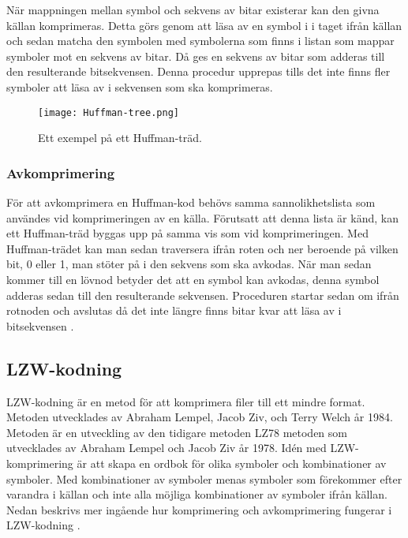 När mappningen mellan symbol och sekvens av bitar existerar kan den givna källan komprimeras. Detta görs genom att läsa av en symbol i i taget ifrån källan och sedan matcha den symbolen med symbolerna som finns i listan som mappar symboler mot en sekvens av bitar. Då ges en sekvens av bitar som adderas till den resulterande bitsekvensen. Denna procedur upprepas tills det inte finns fler symboler att läsa av i sekvensen som ska komprimeras.  
	
\begin{figure}
  \texttt{[image: Huffman-tree.png]}
  \caption{Ett exempel på ett Huffman-träd.}
  \label{fig:huffman-tree}
\end{figure}


	\subsubsection{Avkomprimering}
	För att avkomprimera en Huffman-kod behövs samma sannolikhetslista som användes vid komprimeringen av en källa. Förutsatt att denna lista är känd, kan ett Huffman-träd byggas upp på samma vis som vid komprimeringen. Med Huffman-trädet kan man sedan traversera ifrån roten och ner beroende på vilken bit, 0 eller 1, man stöter på i den sekvens som ska avkodas. När man sedan kommer till en lövnod betyder det att en symbol kan avkodas, denna symbol adderas sedan till den resulterande sekvensen. Proceduren startar sedan om ifrån rotnoden och avslutas då det inte längre finns bitar kvar att läsa av i bitsekvensen \cite{huffmancoding2018}.
	
\subsection{LZW-kodning}
LZW-kodning är en metod för att komprimera filer till ett mindre format. Metoden utvecklades av Abraham Lempel, Jacob Ziv, och Terry Welch år 1984. Metoden är en utveckling av den tidigare metoden LZ78 metoden som utvecklades av Abraham Lempel och Jacob Ziv år 1978. Idén med LZW-komprimering är att skapa en ordbok för olika symboler och kombinationer av symboler. Med kombinationer av symboler menas symboler som förekommer efter varandra i källan och inte alla möjliga kombinationer av symboler ifrån källan. Nedan beskrivs mer ingående hur komprimering och avkomprimering fungerar i LZW-kodning \cite{lempelzivwelch2018}.
